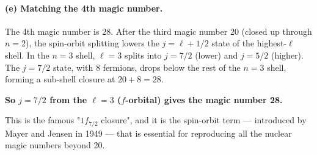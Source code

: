 \documentclass[11pt]{article}
\begin{document}
\paragraph{(e) Matching the 4th magic number.} The 4th magic number is 28. After the third magic number 20 (closed up through $n=2$), the spin-orbit splitting lowers the $j=\ell+1/2$ state of the highest-$\ell$ shell. In the $n=3$ shell, $\ell=3$ splits into $j=7/2$ (lower) and $j=5/2$ (higher). The $j=7/2$ state, with 8 fermions, drops below the rest of the $n=3$ shell, forming a sub-shell closure at $20+8=28$.

\textbf{So $j=7/2$ from the $\ell=3$ ($f$-orbital) gives the magic number 28.}

This is the famous "$1f_{7/2}$ closure", and it is the spin-orbit term --- introduced by Mayer and Jensen in 1949 --- that is essential for reproducing all the nuclear magic numbers beyond 20.
\end{document}
